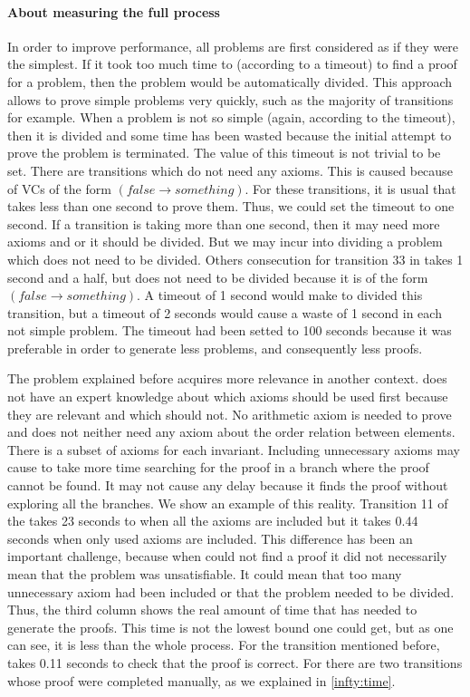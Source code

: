 \paragraph{About measuring the full process}
In order to improve performance, all \spass problems are first considered as if they were the simplest. 
%
If it took \spass too much time to (according to a timeout) to find a proof for a problem, then the problem would be automatically divided.
%
This approach allows to prove simple problems very quickly, such as the majority of \invDisjoint transitions for example. 
%
When a problem is not so simple (again, according to the timeout), then it is divided and some time has been wasted because the initial attempt to prove the problem is terminated.
%
The value of this timeout is not trivial to be set.
%
There are transitions which do not need any axioms. 
%
This is caused because of VCs of the form $(\mathit{false} \to \mathit{something})$.
%
For these transitions, it is usual that \spass takes less than one second to prove them. 
%
Thus, we could set the timeout to one second. 
%
If a transition is taking more than one second, then it may need more axioms and or it should be divided.
%
But we may incur into dividing a problem which does not need to be divided. 
%
Others consecution for transition 33 in \invLock takes 1 second and a half, but does not need to be divided because it is of the form $(false \to something)$.
%
A timeout of 1 second would make \gandalf to divided this transition, but a timeout of 2 seconds would cause a waste of 1 second in each not simple \spass problem.
%
The timeout had been setted to 100 seconds because it was preferable in order to generate less \spass problems, and consequently less proofs.

The problem explained before acquires more relevance in another context.
%
\spass does not have an expert knowledge about which axioms should be used first because they are relevant and which should not.
%
No arithmetic axiom is needed to prove \invRegion and \spass does not neither need any axiom about the order relation between elements. 
%
There is a subset of axioms for each invariant.
%
Including unnecessary axioms may cause \spass to take more time searching for the proof in a branch where the proof cannot be found. 
%
It may not cause any delay because it finds the proof without exploring all the branches.
%
We show an example of this reality.
%
Transition 11 of the \invPreserve takes 23 seconds to \spass when all the axioms are included but it takes 0.44 seconds when only used axioms are included. 
%
This difference has been an important challenge, because when \spass could not find a proof it did not necessarily mean that the problem was unsatisfiable. 
%
It could mean that too many unnecessary axiom had been included or that the problem needed to be divided.
%
Thus, the third column shows the real amount of time that \spass has needed to generate the proofs. 
%
This time is not the lowest bound one could get, but as one can see, it is less than the whole process.
%
For the transition mentioned before, \spass takes 0.11 seconds to check that the proof is correct.
%
For \invPreserve there are two transitions whose proof were completed manually, as we explained in \ref{infty:time}.